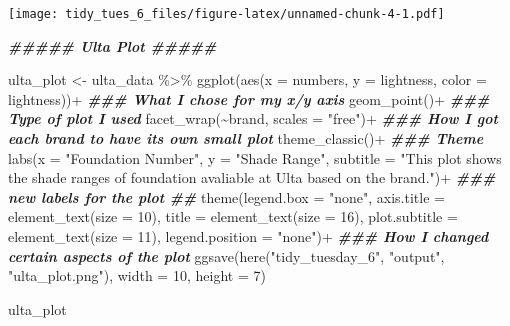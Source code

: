 \documentclass[
]{article}
\newenvironment{Shaded}{\begin{snugshade}}{\end{snugshade}}
\newcommand{\AttributeTok}[1]{\textcolor[rgb]{0.77,0.63,0.00}{#1}}
\newcommand{\DecValTok}[1]{\textcolor[rgb]{0.00,0.00,0.81}{#1}}
\newcommand{\DocumentationTok}[1]{\textcolor[rgb]{0.56,0.35,0.01}{\textbf{\textit{#1}}}}
\newcommand{\FunctionTok}[1]{\textcolor[rgb]{0.00,0.00,0.00}{#1}}
\newcommand{\NormalTok}[1]{#1}
\newcommand{\OtherTok}[1]{\textcolor[rgb]{0.56,0.35,0.01}{#1}}
\newcommand{\SpecialCharTok}[1]{\textcolor[rgb]{0.00,0.00,0.00}{#1}}
\newcommand{\StringTok}[1]{\textcolor[rgb]{0.31,0.60,0.02}{#1}}
\begin{document}
\texttt{[image: tidy\_tues\_6\_files/figure-latex/unnamed-chunk-4-1.pdf]}

\begin{Shaded}
\begin{Highlighting}[]
\DocumentationTok{\#\#\#\#\# Ulta Plot \#\#\#\#\#}

\NormalTok{ulta\_plot }\OtherTok{\textless{}{-}}\NormalTok{ ulta\_data }\SpecialCharTok{\%\textgreater{}\%}
  \FunctionTok{ggplot}\NormalTok{(}\FunctionTok{aes}\NormalTok{(}\AttributeTok{x =}\NormalTok{ numbers,             }
             \AttributeTok{y =}\NormalTok{ lightness,}
             \AttributeTok{color =}\NormalTok{ lightness))}\SpecialCharTok{+}               \DocumentationTok{\#\#\# What I chose for my x/y axis}
  \FunctionTok{geom\_point}\NormalTok{()}\SpecialCharTok{+}                                 \DocumentationTok{\#\#\# Type of plot I used}
  \FunctionTok{facet\_wrap}\NormalTok{(}\SpecialCharTok{\textasciitilde{}}\NormalTok{brand, }\AttributeTok{scales =} \StringTok{"free"}\NormalTok{)}\SpecialCharTok{+}          \DocumentationTok{\#\#\# How I got each brand to have its own small plot}
  \FunctionTok{theme\_classic}\NormalTok{()}\SpecialCharTok{+}                              \DocumentationTok{\#\#\# Theme }
  \FunctionTok{labs}\NormalTok{(}\AttributeTok{x =} \StringTok{"Foundation Number"}\NormalTok{,}
       \AttributeTok{y =} \StringTok{"Shade Range"}\NormalTok{,}
       \AttributeTok{subtitle =} \StringTok{"This plot shows the shade ranges of foundation }
\StringTok{avaliable at Ulta based on the brand."}\NormalTok{)}\SpecialCharTok{+}        \DocumentationTok{\#\#\# new labels for the plot \#\#}
  \FunctionTok{theme}\NormalTok{(}\AttributeTok{legend.box =} \StringTok{"none"}\NormalTok{,}
        \AttributeTok{axis.title =} \FunctionTok{element\_text}\NormalTok{(}\AttributeTok{size =} \DecValTok{10}\NormalTok{),}
        \AttributeTok{title =} \FunctionTok{element\_text}\NormalTok{(}\AttributeTok{size =} \DecValTok{16}\NormalTok{),}
        \AttributeTok{plot.subtitle =} \FunctionTok{element\_text}\NormalTok{(}\AttributeTok{size =} \DecValTok{11}\NormalTok{),}
        \AttributeTok{legend.position =} \StringTok{"none"}\NormalTok{)}\SpecialCharTok{+}             \DocumentationTok{\#\#\# How I changed certain aspects of the plot}
  \FunctionTok{ggsave}\NormalTok{(}\FunctionTok{here}\NormalTok{(}\StringTok{"tidy\_tuesday\_6"}\NormalTok{, }\StringTok{"output"}\NormalTok{, }\StringTok{"ulta\_plot.png"}\NormalTok{),}
       \AttributeTok{width =} \DecValTok{10}\NormalTok{, }\AttributeTok{height =} \DecValTok{7}\NormalTok{)}

\NormalTok{ulta\_plot}
\end{Highlighting}
\end{Shaded}
\end{document}
